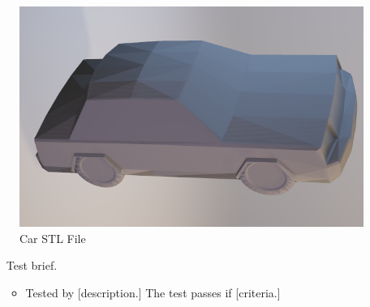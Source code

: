 \begin{figure}[H]
    \centering
    \includegraphics[width=\textwidth]{Car-STL.png}
    \caption{Car STL File}
    \label{Car-STL}
\end{figure}

\begin{itemize} 
    \item [Test brief.]
    \begin{itemize}
        \item Tested by [description.] The test passes if [criteria.]
    \end{itemize}    
\end{itemize}